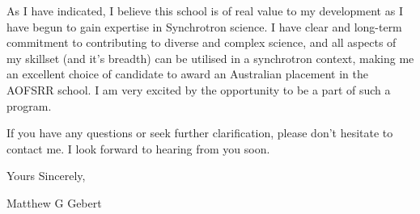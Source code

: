 \documentclass[10pt,a4paper,ragged2e,withhyper,paragraphstrue]{altacv}
\newcommand{\pind}{\hspace{24pt}}
\begin{document}
{    %
    \pind As I have indicated, I believe this school is of real value to my development as I have begun to gain expertise in Synchrotron science. I have clear and long-term commitment to contributing to diverse and complex science, and all aspects of my skillset (and it's breadth) can be utilised in a synchrotron context, making me an excellent choice of candidate to award an Australian placement in the AOFSRR school. I am very excited by the opportunity to be a part of such a program. 
    
    \pind If you have any questions or seek further clarification, please don't hesitate to contact me. I look forward to hearing from you soon.
    
    \vspace{1em}

    Yours Sincerely, \newline

    {\color{emphasis}Matthew G Gebert}

    }
    
    \divider
\end{document}
